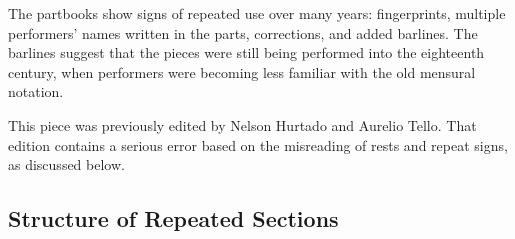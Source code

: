 The partbooks show signs of repeated use over many years: fingerprints, multiple performers' names written in the parts, corrections, and added barlines.
The barlines suggest that the pieces were still being performed into the eighteenth century, when performers were becoming less familiar with the old mensural notation.

This piece was previously edited by Nelson Hurtado and Aurelio Tello. 
That edition contains a serious error based on the misreading of rests and repeat signs, as discussed below. %

\subsection*{Structure of Repeated Sections}


